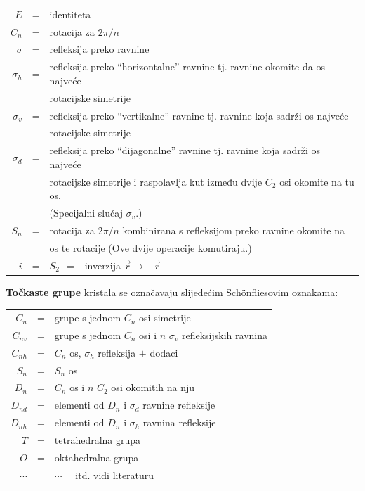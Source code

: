 \begin{tabular}{rcl}
$E$ & = & identiteta \\
$C_n$ & = & rotacija za $2\pi/n$ \\
$\sigma$ & = & refleksija preko ravnine \\
$\sigma_{h}$ & = & refleksija preko ``horizontalne'' ravnine tj. ravnine
  okomite da os najveće  \\ && rotacijske simetrije \\
$\sigma_{v}$ & = & refleksija preko ``vertikalne'' ravnine tj. ravnine
  koja sadrži os najveće \\ &&rotacijske simetrije \\
$\sigma_{d}$ & = & refleksija preko ``dijagonalne'' ravnine tj. ravnine
  koja sadrži os najveće \\ && rotacijske simetrije i raspolavlja kut između
  dvije $C_2$ osi okomite na tu os. \\ &&(Specijalni slučaj $\sigma_{v}$.) \\
$S_n$  & = & rotacija za $2\pi/n$ kombinirana s refleksijom preko ravnine
   okomite na \\ && os te rotacije (Ove dvije operacije komutiraju.) \\
$i$ & = &  $S_2 \;\, = \;\,$  inverzija $\vec{r} \to -\vec{r}$
\end{tabular}

\textbf{Točkaste grupe} kristala se označavaju slijedećim
Sch\"{o}nfliesovim oznakama:

\begin{tabular}{rcl}
$C_n$ & = & grupe s jednom $C_n$ osi simetrije \\
$C_{nv}$ & = & grupe s jednom $C_n$ osi i $n$ $\sigma_v$
   refleksijskih ravnina  \\
$C_{nh}$ & = & $C_n$ os,  $\sigma_h$ refleksija $+$ dodaci \\
$S_{n}$ & = & $S_n$ os \\
$D_{n}$ & = & $C_n$ os i $n$ $C_2$ osi okomitih na nju \\
$D_{nd}$ & = & elementi od $D_{n}$ i $\sigma_d$ ravnine refleksije \\
$D_{nh}$ & = & elementi od $D_{n}$ i $\sigma_h$ ravnina refleksije \\
$T$  & = & tetrahedralna grupa \\
$O$  & = & oktahedralna grupa \\
$\cdots$ && $\cdots \quad$ itd. vidi literaturu \\
\end{tabular}

